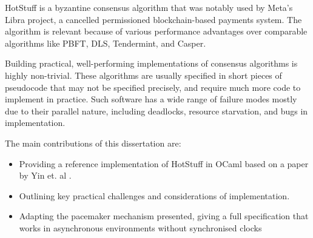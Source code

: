 HotStuff is a byzantine consensus algorithm that was notably used by Meta's Libra project, a cancelled permissioned blockchain-based payments system. The algorithm is relevant because of various performance advantages over comparable algorithms like PBFT, DLS, Tendermint, and Casper.


Building practical, well-performing implementations of consensus algorithms is highly non-trivial. These algorithms are usually specified in short pieces of pseudocode that may not be specified precisely, and require much more code to implement in practice. Such software has a wide range of failure modes mostly due to their parallel nature, including deadlocks, resource starvation, and bugs in implementation. \cite{chubby}

The main contributions of this dissertation are:
\begin{itemize}
	\item Providing a reference implementation of HotStuff in OCaml based on a paper by Yin et. al \cite{yin2019hotstuff}.
	\item Outlining key practical challenges and considerations of implementation.
	\item Adapting the pacemaker mechanism presented, giving a full specification that works in asynchronous environments without synchronised clocks
\end{itemize}

